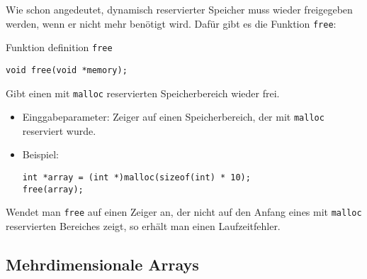 Wie schon angedeutet, dynamisch reservierter Speicher muss wieder freigegeben werden, wenn er nicht mehr benötigt wird.
Dafür gibt es die Funktion \verb|free|:
\begin{myexampleblock}{Funktion definition \texttt{free}}
\begin{lstlisting}
void free(void *memory);
\end{lstlisting}
  \vspace{-0.7cm}
  Gibt einen mit \verb|malloc| reservierten Speicherbereich wieder frei.
  \begin{itemize}
  \item Einggabeparameter: Zeiger auf einen Speicherbereich, der mit \verb|malloc| reserviert wurde.
  \item Beispiel:
\begin{lstlisting}
int *array = (int *)malloc(sizeof(int) * 10);
free(array);
\end{lstlisting}
  \end{itemize}
  \vspace{-0.7cm}
\end{myexampleblock}
Wendet man \verb|free| auf einen Zeiger an, der nicht auf den Anfang eines mit \verb|malloc| reservierten Bereiches zeigt, so erhält man einen Laufzeitfehler.

\subsection{Mehrdimensionale Arrays}

